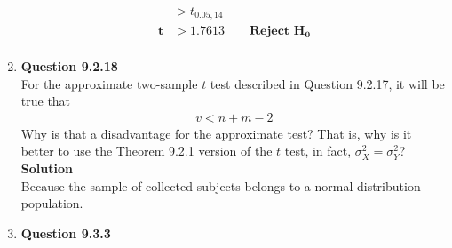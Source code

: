 \documentclass{uofa-eng-assignment}
\begin{document}
\begin{enumerate}
\begin{align*}
                           & > t_{0.05, 14}                                                          \\
            \boldsymbol{t} & > \boldsymbol{1.7613} \qquad \textbf{Reject } \boldsymbol{H_0}          \\
        \end{align*}
    \item[]
        \textbf{Question 9.2.18} \\
        For the approximate two-sample $t$ test described in Question 9.2.17, it will be true that
        \begin{align*}
            v < n + m -2
        \end{align*}
        Why is that a disadvantage for the approximate test?
        That is, why is it better to use the Theorem 9.2.1 version of the $t$ test,
        in fact, $\sigma^2_X = \sigma^2_Y$? \\
        \textbf{Solution} \\
        Because the sample of collected subjects belongs to a normal distribution population.
    \item[]
        \textbf{Question 9.3.3} \\


\end{enumerate}
\end{document}
